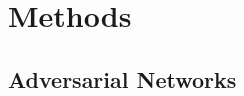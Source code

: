 \documentclass[10pt,twocolumn,letterpaper]{article}
\begin{document}





\section{Methods}

\subsection{Adversarial Networks}
\end{document}
